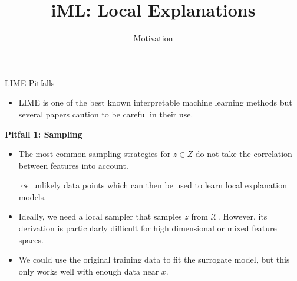 \documentclass[aspectratio=169]{../latex_main/tntbeamer}  %
\title[Introduction]{iML: Local Explanations}
\subtitle{Motivation}
\begin{document}
	
	\maketitle

\begin{frame}{LIME Pitfalls }
  \begin{itemize}
  	\item LIME is one of the best known interpretable machine learning methods but several papers caution to be careful in their use. 
  \end{itemize}
	\textbf{Pitfall 1: Sampling}
	\begin{itemize}
	  \item The most common sampling strategies for $z \in Z$ do not take the correlation between features into account. 
      \item[$\leadsto$] unlikely data points which can then be used to learn local explanation models.
      \item Ideally, we need a local sampler that samples $z$ from $\mathcal{X}$. However, its derivation is particularly difficult for high dimensional or mixed feature spaces. 
      \item We could use the original training data to fit the surrogate model, but this only works well with enough data near $x$.
    \end{itemize}
\end{frame}
\end{document}
